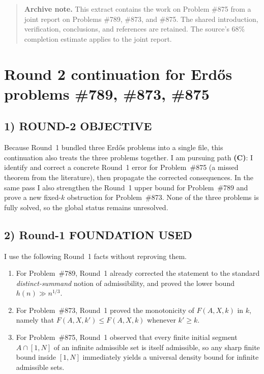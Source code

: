 \begin{quote}
\textbf{Archive note.} This extract contains the work on Problem \#875 from a joint report on Problems \#789, \#873, and \#875. The shared introduction, verification, conclusions, and references are retained. The source's 68\% completion estimate applies to the joint report.
\end{quote}

\section{Round 2 continuation for Erd\H{o}s problems \#789, \#873, \#875}

\subsection*{1) ROUND-2 OBJECTIVE}

Because Round~1 bundled three Erd\H{o}s problems into a single file, this continuation also treats the three problems together. I am pursuing path \textbf{(C)}: I identify and correct a concrete Round~1 error for Problem~\#875 (a missed theorem from the literature), then propagate the corrected consequences. In the same pass I also strengthen the Round~1 upper bound for Problem~\#789 and prove a new fixed-\(k\) obstruction for Problem~\#873. None of the three problems is fully solved, so the global status remains unresolved.

\subsection*{2) Round-1 FOUNDATION USED}

I use the following Round~1 facts without reproving them.

\begin{enumerate}
\item For Problem~\#789, Round~1 already corrected the statement to the standard \emph{distinct-summand} notion of admissibility, and proved the lower bound \(h(n) \gg n^{1/3}\).
\item For Problem~\#873, Round~1 proved the monotonicity of \(F(A,X,k)\) in \(k\), namely that \(F(A,X,k') \le F(A,X,k)\) whenever \(k'\ge k\).
\item For Problem~\#875, Round~1 observed that every finite initial segment \(A\cap [1,N]\) of an infinite admissible set is itself admissible, so any sharp finite bound inside \([1,N]\) immediately yields a universal density bound for infinite admissible sets.
\end{enumerate}

